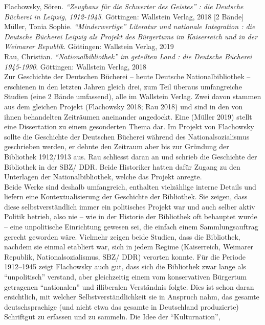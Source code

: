 \documentclass[a4paper,
fontsize=11pt,
oneside,
numbers=noperiodatend,
parskip=half-,
bibliography=totoc,
final
]{scrartcl}
\begin{document}
Flachowsky, Sören. \emph{``Zeughaus für die Schwerter des Geistes'' :
die Deutsche Bücherei in Leipzig, 1912-1945}. Göttingen: Wallstein
Verlag, 2018 {[}2 Bände{]}\\
Müller, Tonia Sophie. \emph{``Minderwertige'' Literatur und nationale
Integration : die Deutsche Bücherei Leipzig als Projekt des Bürgertums
im Kaiserreich und in der Weimarer Republik}. Göttingen: Wallstein
Verlag, 2019\\
Rau, Christian. \emph{``Nationalbibliothek'' im geteilten Land : die
Deutsche Bücherei 1945-1990}. Göttingen: Wallstein Verlag, 2018\\
Zur Geschichte der Deutschen Bücherei -- heute Deutsche
Nationalbibliothek -- erschienen in den letzten Jahren gleich drei, zum
Teil überaus umfangreiche Studien (eine 2 Bände umfassend), alle im
Wallstein Verlag. Zwei davon stammen aus dem gleichen Projekt
(Flachowsky 2018; Rau 2018) und sind in den von ihnen behandelten
Zeiträumen aneinander angedockt. Eine (Müller 2019) stellt eine
Dissertation zu einem gesonderten Thema dar. Im Projekt von Flachowsky
sollte die Geschichte der Deutschen Bücherei während des
Nationalsozialismus geschrieben werden, er dehnte den Zeitraum aber bis
zur Gründung der Bibliothek 1912/1913 aus. Rau schliesst daran an und
schrieb die Geschichte der Bibliothek in der SBZ/ DDR. Beide Historiker
hatten dafür Zugang zu den Unterlagen der Nationalbibliothek, welche das
Projekt anregte.\\
Beide Werke sind deshalb umfangreich, enthalten vielzählige interne
Details und liefern eine Kontextualisierung der Geschichte der
Bibliothek. Sie zeigen, dass diese selbstverständlich immer ein
politisches Projekt war und auch selber aktiv Politik betrieb, also nie
-- wie in der Historie der Bibliothek oft behauptet wurde -- eine
unpolitische Einrichtung gewesen sei, die einfach einem Sammlungsauftrag
gerecht geworden wäre. Vielmehr zeigen beide Studien, dass die
Bibliothek, nachdem sie einmal etabliert war, sich in jedem Regime
(Kaiserreich, Weimarer Republik, Nationalsozialismus, SBZ/ DDR) verorten
konnte. Für die Periode 1912--1945 zeigt Flachowsky auch gut, dass sich
die Bibliothek zwar lange als ``unpolitisch'' verstand, aber
gleichzeitig einem vom konservativen Bürgertum getragenen ``nationalen''
und illiberalen Verständnis folgte. Dies ist schon daran ersichtlich,
mit welcher Selbstverständlichkeit sie in Anspruch nahm, das gesamte
deutschsprachige (und nicht etwa das gesamte in Deutschland produzierte)
Schriftgut zu erfassen und zu sammeln. Die Idee der ``Kulturnation'',
\end{document}
